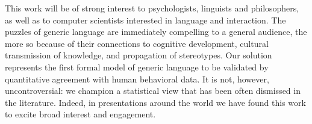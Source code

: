 \documentclass[11pt,letterpaper]{letter} %
\begin{document}
\begin{letter}
This work will be of strong interest to psychologists, linguists and philosophers, as well as to computer scientists interested in language and interaction.
The puzzles of generic language are immediately compelling to a general audience, the more so because of their connections to cognitive development, cultural transmission of knowledge, and propagation of stereotypes.
Our solution represents the first formal model of generic language to be validated by quantitative agreement with human behavioral data.
It is not, however, uncontroversial: we champion a statistical view that has been often dismissed in the literature.
Indeed, in presentations around the world we have found this work to excite broad interest and engagement.









%




\end{letter}
\end{document}
